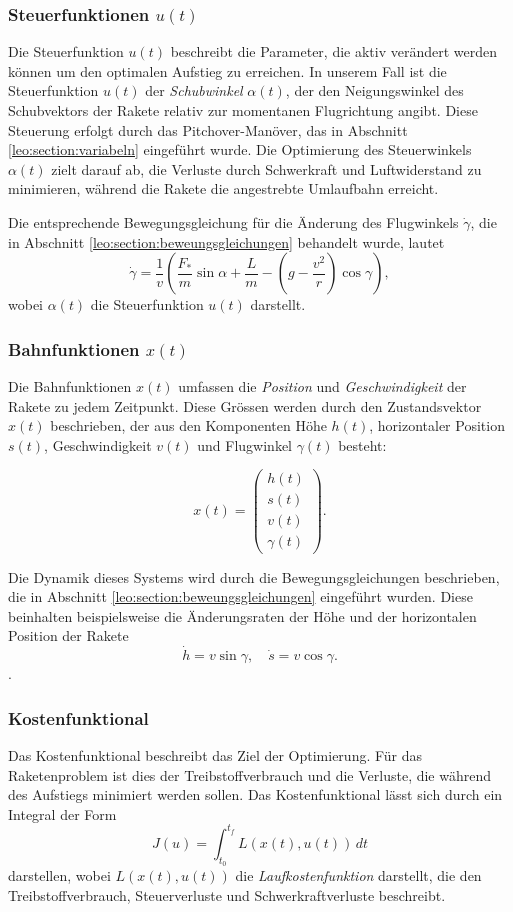 \subsubsection{Steuerfunktionen \( u(t) \)}

Die Steuerfunktion \( u(t) \) beschreibt die Parameter, die aktiv verändert werden können um den optimalen Aufstieg zu erreichen. 
In unserem Fall ist die Steuerfunktion \( u(t) \) der \textit{Schubwinkel} \( \alpha(t) \), der den Neigungswinkel des Schubvektors der Rakete relativ zur momentanen Flugrichtung angibt. 
Diese Steuerung erfolgt durch das Pitchover-Manöver, das in Abschnitt \ref{leo:section:variabeln} eingeführt wurde. 
Die Optimierung des Steuerwinkels \( \alpha(t) \) zielt darauf ab, die Verluste durch Schwerkraft und Luftwiderstand zu minimieren, während die Rakete die angestrebte Umlaufbahn erreicht.

Die entsprechende Bewegungsgleichung für die Änderung des Flugwinkels \( \dot{\gamma} \), die in Abschnitt \ref{leo:section:beweungsgleichungen} behandelt wurde, lautet
\[
\dot{\gamma} = \frac{1}{v} \left( \frac{F_*}{m} \sin \alpha + \frac{L}{m} - \left( g - \frac{v^2}{r} \right) \cos \gamma \right),
\]
wobei \( \alpha(t) \) die Steuerfunktion \( u(t) \) darstellt.

\subsubsection{Bahnfunktionen \( x(t) \)}
Die Bahnfunktionen \( x(t) \) umfassen die \textit{Position} und \textit{Geschwindigkeit} der Rakete zu jedem Zeitpunkt. 
Diese Grössen werden durch den Zustandsvektor \( x(t) \) beschrieben, der aus den Komponenten Höhe \( h(t) \), horizontaler Position \( s(t) \), Geschwindigkeit \( v(t) \) und Flugwinkel \( \gamma(t) \) besteht:

\[
x(t) = \begin{pmatrix} h(t) \\ s(t) \\ v(t) \\ \gamma(t) \end{pmatrix}.
\]

Die Dynamik dieses Systems wird durch die Bewegungsgleichungen beschrieben, die in Abschnitt \ref{leo:section:beweungsgleichungen} eingeführt wurden. 
Diese beinhalten beispielsweise die Änderungsraten der Höhe und der horizontalen Position der Rakete
\[
\dot{h} = v \sin \gamma, \quad \dot{s} = v \cos \gamma.
\].

\subsubsection{Kostenfunktional}
Das Kostenfunktional beschreibt das Ziel der Optimierung. Für das Raketenproblem ist dies der Treibstoffverbrauch und die Verluste, die während des Aufstiegs minimiert werden sollen. 
Das Kostenfunktional lässt sich durch ein Integral der Form
\[
J(u) = \int_{t_0}^{t_f} L(x(t), u(t)) \, dt
\]
darstellen, wobei \( L(x(t), u(t)) \) die \textit{Laufkostenfunktion} darstellt, die den Treibstoffverbrauch, Steuerverluste und Schwerkraftverluste beschreibt.

